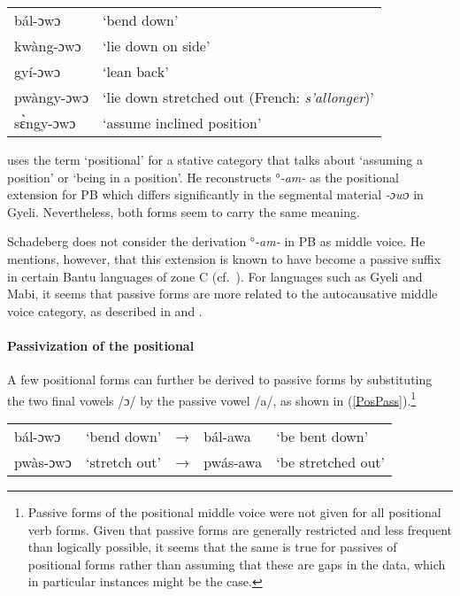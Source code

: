 \begin{exe} \ex \label{Positional2}
\begin{tabular}{ll}
bál-ɔwɔ & `bend down' \\
kwàng-ɔwɔ & `lie down on side' \\
gyí-ɔwɔ & `lean back' \\
pwàngy-ɔwɔ & `lie down stretched out (French: {\itshape s'allonger})'  \\
sɛ̀ngy-ɔwɔ & `assume inclined position' \\
\end{tabular}
\end{exe}

\citet[75]{schadeberg2003} uses the term `positional' for a stative category that talks about ‘assuming a position’ or ‘being in a position’. He reconstructs °{\itshape -am-} as the positional extension for PB which differs significantly in the segmental material {\itshape -ɔwɔ} in Gyeli. Nevertheless, both forms seem to carry the same meaning.

Schadeberg does not consider the derivation °{\itshape -am-} in PB as middle voice. He mentions, however, that this extension is known to have become a passive suffix in certain Bantu languages of zone C (cf.\ \citet[76]{schadeberg2003}). For languages such as Gyeli and Mabi, it seems that passive forms are more related to the autocausative middle voice category, as described in  and .


\paragraph{Passivization of the positional} A few positional forms can further be derived to passive forms by substituting the two final vowels /ɔ/ by the passive vowel /a/, as shown in (\ref{PosPass}).\footnote{Passive forms of the positional middle voice were not given for all positional verb forms. Given that passive forms are generally restricted and less frequent than logically possible, it seems that the same is true for passives of positional forms rather than assuming that these are gaps in the data, which in particular instances might be the case.} 


\begin{exe} \ex \label{PosPass}
\begin{tabular}{llllp{4cm}}
bál-ɔwɔ & `bend down' & → & bál-awa & `be bent down' \\
pwàs-ɔwɔ & `stretch out' & → & pwás-awa & `be stretched out' \\
\end{tabular}
\end{exe}

